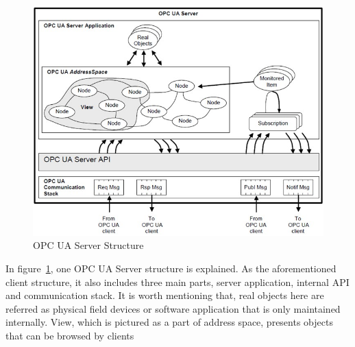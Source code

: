 \documentclass[]{llncs}
\begin{document}
\begin{figure}
	\centering
	\includegraphics[width=1\textwidth]{server.jpg}
		\caption[ ]{OPC UA Server Structure\cite{O1}}
	\label{fig:server}
\end{figure}

In figure~\ref{fig:server}, one OPC UA Server structure is explained. As the aforementioned client structure, it also includes three main parts, server application, internal API and communication stack. It is worth mentioning that, real objects here are referred as physical field devices or software application that is only maintained internally. View, which is pictured as a part of address space, presents objects that can be browsed by clients
\end{document}
